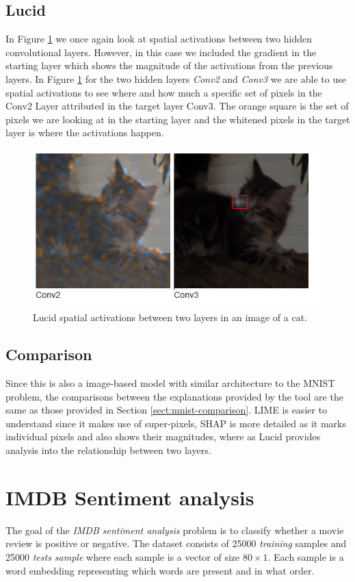 \subsection{Lucid}
In Figure \ref{fig:lucid-cat} we once again look at spatial activations between two hidden convolutional layers. However, in this case we included the gradient in the starting layer which shows the magnitude of the activations from the previous layers. In Figure \ref{fig:lucid-cat} for the two hidden layers \emph{Conv2} and \emph{Conv3} we are able to use spatial activations to see where and how much a specific set of pixels in the Conv2 Layer attributed in the target layer Conv3. The orange square is the set of pixels we are looking at in the starting layer and the whitened pixels in the target layer is where the activations happen.
\begin  {figure}[!htpb]
  \includegraphics[width=\linewidth]{Evaluation_Images/LUCID_CATS_DOGS_2_v2.png}
  \caption{Lucid spatial activations between two layers in an image of a cat.}
  \label{fig:lucid-cat}
\end{figure}
\subsection{Comparison}
Since this is also a image-based model with similar architecture to the MNIST problem, the comparisons between the explanations provided by the tool are the same as those provided in Section \ref{sect:mnist-comparison}. LIME is easier to understand since it makes use of super-pixels, SHAP is more detailed as it marks individual pixels and also shows their magnitudes, where as Lucid provides analysis into the relationship between two layers.
\section{IMDB Sentiment analysis}
The goal of the \emph{IMDB sentiment analysis} problem is to classify whether a movie review is positive or negative. The dataset consists of 25000 \emph{training} samples and 25000 \emph{tests sample} where each sample is a vector of size $80\times1$. Each sample is a word embedding representing which words are present and in what order.
